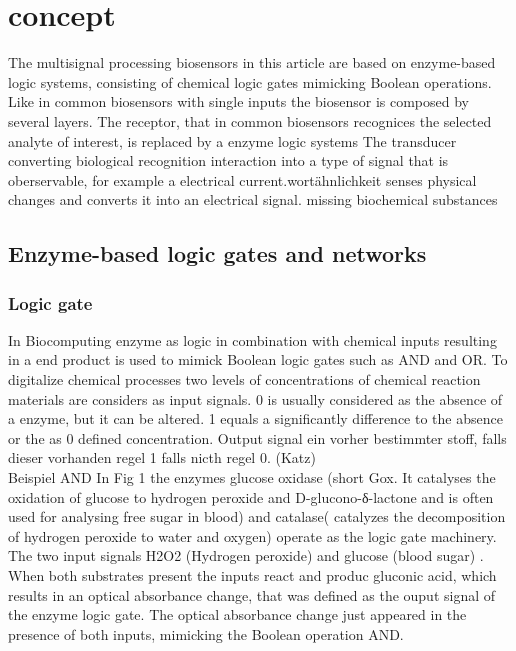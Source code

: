 \documentclass[runningheads]{llncs}
\begin{document}
\section{concept}

The multisignal processing biosensors in this article are based on enzyme-based logic systems, consisting of chemical logic gates mimicking Boolean operations. Like in common biosensors with single inputs the biosensor is composed by several layers. The receptor, that in common biosensors recognices the selected analyte of interest, is replaced by a enzyme logic systems
The transducer converting biological recognition interaction into a type of signal that is oberservable, for example a electrical current.wortähnlichkeit senses physical changes and converts it into an electrical signal.
missing biochemical substances

\subsection{Enzyme-based logic gates and networks}	
	\subsubsection{Logic gate}	
		In Biocomputing enzyme as logic in combination with chemical inputs resulting in a end product is used to mimick Boolean logic gates such as AND and OR. To digitalize chemical processes two levels of concentrations of chemical reaction materials are considers as input signals. 0 is usually considered as the absence of a enzyme, but it can be altered. 1 equals a  significantly difference to the absence or the as 0 defined concentration.
		Output signal ein vorher bestimmter stoff, falls dieser vorhanden regel 1 falls nicth regel 0.  
	(Katz) \\
	
		Beispiel AND 
		In Fig 1 the enzymes glucose oxidase (short Gox. It catalyses the oxidation of glucose to hydrogen peroxide and D-glucono-δ-lactone and is often used for analysing free sugar in blood) and catalase( catalyzes the decomposition of hydrogen peroxide to water and oxygen) operate as the logic gate machinery. The two input signals H2O2 (Hydrogen peroxide) and glucose (blood sugar) . When both substrates present the inputs react and produc gluconic acid, which results in an optical absorbance change, that was defined as the ouput signal of the enzyme logic gate. The optical absorbance change just appeared in the presence of both inputs, mimicking the Boolean operation AND. 
		
\end{document}
